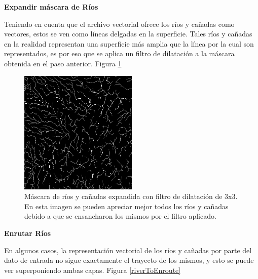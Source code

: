 \documentclass[10pt,a4paper, twoside]{report}
\begin{document}

\textbf{Expandir máscara de Ríos}

Teniendo en cuenta que el archivo vectorial ofrece los ríos y cañadas como vectores, estos se ven como líneas delgadas en la superficie. Tales ríos y cañadas en la realidad representan una superficie más amplia que la línea por la cual son representados, es por eso que se aplica un filtro de dilatación a la máscara obtenida en el paso anterior. Figura \ref{riosExpandidos}

\begin{figure}[H]
   \centering      
   \includegraphics[width=0.5\textwidth]{imagenes/riosExpandidos.jpg}
 \caption{Máscara de ríos y cañadas expandida con filtro de dilatación de 3x3. En esta imagen se pueden apreciar mejor todos los ríos y cañadas debido a que se ensancharon los mismos por el filtro aplicado.}
 \label{riosExpandidos}
\end{figure}

\textbf{Enrutar Ríos}

En algunos casos, la representación vectorial de los ríos y cañadas por parte del dato de entrada no sigue exactamente el trayecto de los mismos, y esto se puede ver superponiendo ambas capas. Figura \ref{riverToEnroute}
\end{document}
